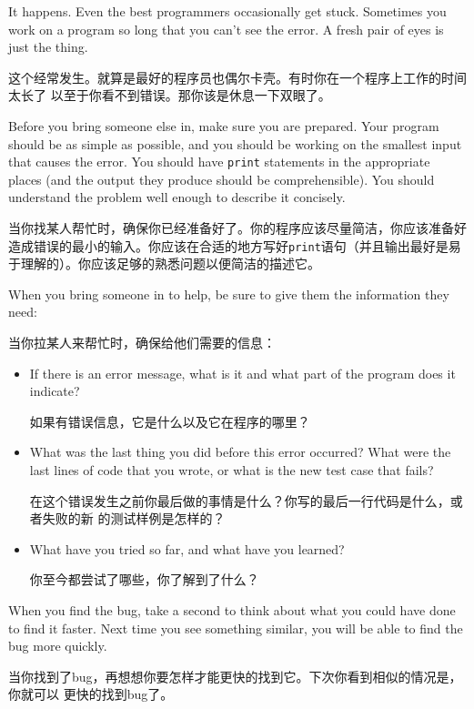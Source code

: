 \documentclass[10pt]{book}
\begin{document}
\begin{CJK}{UTF8}{gbsn}
It happens.  Even the best programmers occasionally get stuck.
Sometimes you work on a program so long that you can't see the
error.  A fresh pair of eyes is just the thing.

这个经常发生。就算是最好的程序员也偶尔卡壳。有时你在一个程序上工作的时间太长了
以至于你看不到错误。那你该是休息一下双眼了。

Before you bring someone else in, make sure you are prepared.
Your program should be as simple
as possible, and you should be working on the smallest input
that causes the error.  You should have {\tt print} statements in the
appropriate places (and the output they produce should be
comprehensible).  You should understand the problem well enough
to describe it concisely.

当你找某人帮忙时，确保你已经准备好了。你的程序应该尽量简洁，你应该准备好造成错误的最小的输入。你应该在合适的地方写好{\tt print}语句（并且输出最好是易于理解的）。你应该足够的熟悉问题以便简洁的描述它。

When you bring someone in to help, be sure to give
them the information they need:

当你拉某人来帮忙时，确保给他们需要的信息：

\begin{itemize}

\item If there is an error message, what is it
and what part of the program does it indicate?

如果有错误信息，它是什么以及它在程序的哪里？

\item What was the last thing you did before this error occurred?
What were the last lines of code that you wrote, or what is
the new test case that fails?

在这个错误发生之前你最后做的事情是什么？你写的最后一行代码是什么，或者失败的新
的测试样例是怎样的？

\item What have you tried so far, and what have you learned?

    你至今都尝试了哪些，你了解到了什么？

\end{itemize}

When you find the bug, take a second to think about what you
could have done to find it faster.  Next time you see something
similar, you will be able to find the bug more quickly.

当你找到了bug，再想想你要怎样才能更快的找到它。下次你看到相似的情况是，你就可以
更快的找到bug了。


\end{CJK}
\end{document}
